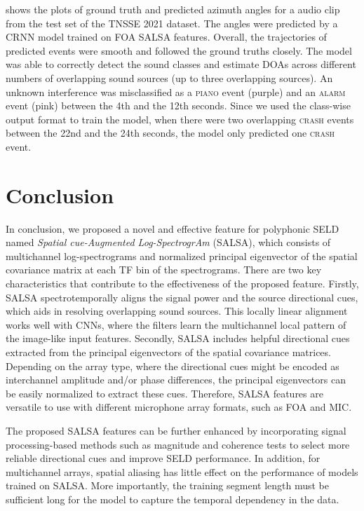 \documentclass[journal]{IEEEtran}
\begin{document}
 shows the plots of ground truth and predicted azimuth angles for a audio clip from the test set of the TNSSE 2021 dataset. The angles were predicted by a CRNN model trained on FOA SALSA features. Overall, the trajectories of predicted events were smooth and followed the ground truths closely. The model was able to correctly detect the sound classes and estimate DOAs across different numbers of overlapping sound sources (up to three overlapping sources). An unknown interference was misclassified as a \textsc{piano} event (purple) and an \textsc{alarm} event (pink) between the \num{4}th and the \num{12}th seconds. Since we used the class-wise output format to train the model, when there were two overlapping \textsc{crash} events between the \num{22}nd and the \num{24}th seconds, the model only predicted one \textsc{crash} event. \section{Conclusion}
\label{sec:conclusion}

In conclusion, we proposed a novel and effective feature for polyphonic SELD named \emph{Spatial cue-Augmented Log-SpectrogrAm} (SALSA), which consists of multichannel log-spectrograms and normalized principal eigenvector of the spatial covariance matrix at each TF bin of the spectrograms. There are two key characteristics that contribute to the effectiveness of the proposed feature. Firstly, SALSA spectrotemporally aligns the signal power and the source directional cues, which aids in resolving overlapping sound sources. This locally linear alignment works well with CNNs, where the filters learn the multichannel local pattern of the image-like input features. Secondly, SALSA includes helpful directional cues extracted from the principal eigenvectors of the spatial covariance matrices. Depending on the array type, where the directional cues might be encoded as interchannel amplitude and/or phase differences, the principal eigenvectors can be easily normalized to extract these cues. Therefore, SALSA features are versatile to use with different microphone array formats, such as FOA and MIC. 

The proposed SALSA features can be further enhanced by incorporating signal processing-based methods such as magnitude and coherence tests to select more reliable directional cues and improve SELD performance. In addition, for multichannel arrays, spatial aliasing has little effect on the performance of models trained on SALSA. More importantly, the training segment length must be sufficient long for the model to capture the temporal dependency in the data.   
\end{document}
